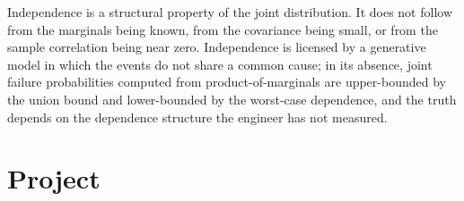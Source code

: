 \begin{principle}
Independence is a structural property of the joint distribution.
It does not follow from the marginals being known, from the
covariance being small, or from the sample correlation being
near zero. Independence is licensed by a generative model in which
the events do not share a common cause; in its absence, joint
failure probabilities computed from product-of-marginals are
upper-bounded by the union bound and lower-bounded by the
worst-case dependence, and the truth depends on the dependence
structure the engineer has not measured.
\end{principle}

\section{Project}\label{sec:vol02:ch13:project}

